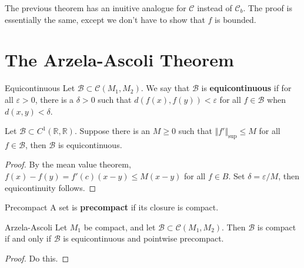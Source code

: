 \documentclass[10pt]{report}
\begin{document}
\begin{note}{}{}
The previous theorem has an inuitive analogue for $\mathcal{C}$ instead of $\mathcal{C}_b$. The proof is essentially the same, except we don't have to show that $f$ is bounded.
\end{note}



\section{The Arzela-Ascoli Theorem}

\begin{defn}{Equicontinuous}{}
	Let $\mathcal{B} \subset \mathcal{C}(M_1, M_2)$. We say that $\mathcal{B}$ is \textbf{equicontinuous} if for all $\varepsilon>0$, there is a $\delta>0$ such that $d(f(x), f(y)) < \varepsilon$ for all $f \in \mathcal{B}$ when $d(x,y) < \delta$.
\end{defn}

\begin{prop}
	Let $\mathcal{B} \subset C^1(\mathbb{R},\mathbb{R})$. Suppose there is an $M \geq 0$ such that $\Vert{f'}\Vert_{\sup} \leq M$ for all $f \in \mathcal{B}$, then $\mathcal{B}$ is equicontinuous.
\end{prop}
\begin{proof}
	By the mean value theorem, $f(x) - f(y) = f'(c) (x-y) \leq M (x-y)$ for all $f \in B$. Set $\delta = \varepsilon/M$, then equicontinuity follows.
\end{proof}

\begin{defn}{Precompact}{}
A set is \textbf{precompact} if its closure is compact.
\end{defn}

\begin{thrm}{Arzela-Ascoli}{}
	Let $M_1$ be compact, and let $\mathcal{B} \subset \mathcal{C}(M_1, M_2)$. Then $\mathcal{B}$ is compact if and only if $\mathcal{B}$ is equicontinuous and pointwise precompact.
\end{thrm}
\begin{proof}
	{\color{red}Do this.}
\end{proof}
\end{document}
